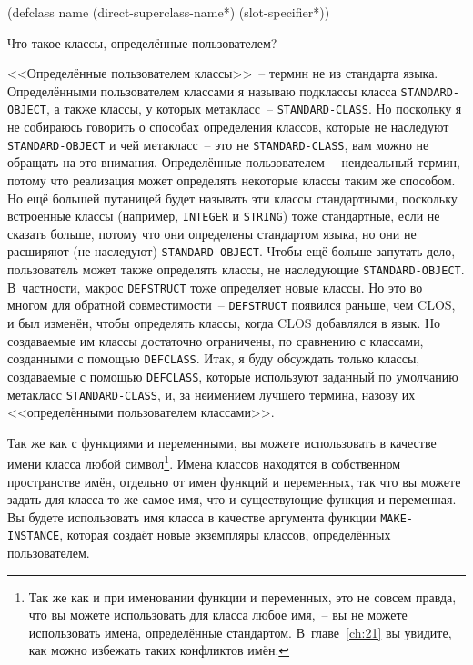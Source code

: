 \begin{myverb}
(defclass name (direct-superclass-name*)
  (slot-specifier*))
\end{myverb}

Что такое классы, определённые пользователем?

<<Определённые пользователем классы>>~-- термин не из стандарта языка. Определёнными
пользователем классами я называю подклассы класса \lstinline{STANDARD-OBJECT}, а также
классы, у которых метакласс~-- \lstinline{STANDARD-CLASS}. Но поскольку я не собираюсь
говорить о способах определения классов, которые не наследуют \lstinline{STANDARD-OBJECT}
и чей метакласс~-- это не \lstinline{STANDARD-CLASS}, вам можно не обращать на это
внимания. Определённые пользователем~-- неидеальный термин, потому что реализация может
определять некоторые классы таким же способом. Но ещё большей путаницей будет называть эти
классы стандартными, поскольку встроенные классы (например, \lstinline{INTEGER} и
\lstinline{STRING}) тоже стандартные, если не сказать больше, потому что они определены
стандартом языка, но они не расширяют (не наследуют) \lstinline{STANDARD-OBJECT}. Чтобы
ещё больше запутать дело, пользователь может также определять классы, не наследующие
\lstinline{STANDARD-OBJECT}. В~частности, макрос \lstinline{DEFSTRUCT} тоже определяет
новые классы. Но это во многом для обратной совместимости~-- \lstinline{DEFSTRUCT}
появился раньше, чем CLOS, и был изменён, чтобы определять классы, когда CLOS добавлялся в
язык. Но создаваемые им классы достаточно ограничены, по сравнению с классами, созданными с
помощью \lstinline{DEFCLASS}. Итак, я буду обсуждать только классы, создаваемые с помощью
\lstinline{DEFCLASS}, которые используют заданный по умолчанию метакласс
\lstinline{STANDARD-CLASS}, и, за неимением лучшего термина, назову их <<определёнными
пользователем классами>>.

Так же как с функциями и переменными, вы можете использовать в качестве имени класса любой
символ\footnote{Так же как и при именовании функции и переменных, это не совсем правда,
  что вы можете использовать для класса любое имя,~-- вы не можете использовать имена,
  определённые стандартом.  В~главе~\ref{ch:21} вы увидите, как можно избежать таких конфликтов
  имён.}.  Имена классов находятся в собственном пространстве имён, отдельно от имен
функций и переменных, так что вы можете задать для класса то же самое имя, что и
существующие функция и переменная.  Вы будете использовать имя класса в качестве аргумента
функции \lstinline{MAKE-INSTANCE}, которая создаёт новые экземпляры классов, определённых
пользователем.

